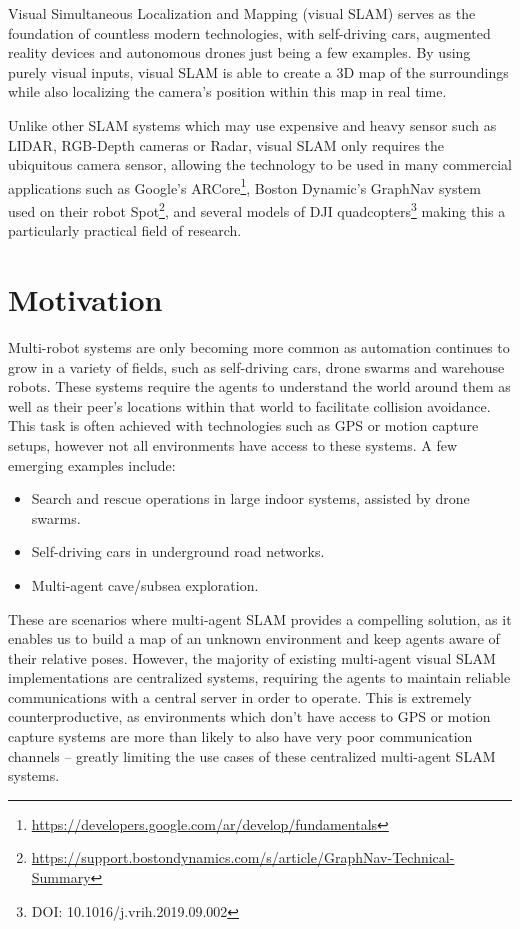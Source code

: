 
\label{sec:introduction}
Visual Simultaneous Localization and Mapping (visual SLAM) serves as the foundation of countless modern technologies, with self-driving cars, augmented reality devices and autonomous drones just being a few examples. By using purely visual inputs, visual SLAM is able to create a 3D map of the surroundings while also localizing the camera's position within this map in real time.

Unlike other SLAM systems which may use expensive and heavy sensor such as LIDAR, RGB-Depth cameras or Radar, visual SLAM only requires the ubiquitous camera sensor, allowing the technology to be used in many commercial applications such as Google's ARCore\footnote[1]{\url{https://developers.google.com/ar/develop/fundamentals}}, Boston Dynamic's GraphNav system used on their robot Spot\footnote[2]{\url{https://support.bostondynamics.com/s/article/GraphNav-Technical-Summary}}, and several models of DJI quadcopters\footnote[3]{DOI: 10.1016/j.vrih.2019.09.002} making this a particularly practical field of research.

\section{Motivation}
\label{sec:motivation}
Multi-robot systems are only becoming more common as automation continues to grow in a variety of fields, such as self-driving cars, drone swarms and warehouse robots. These systems require the agents to understand the world around them as well as their peer's locations within that world to facilitate collision avoidance. This task is often achieved with technologies such as GPS or motion capture setups, however not all environments have access to these systems. A few emerging examples include: \noparskip
\smallbreak

{
    \begin{itemize}[nosep]
        \item Search and rescue operations in large indoor systems, assisted by drone swarms.
        \item Self-driving cars in underground road networks.
        \item Multi-agent cave/subsea exploration.
    \end{itemize}
}

These are scenarios where multi-agent SLAM provides a compelling solution, as it enables us to build a map of an unknown environment and keep agents aware of their relative poses. However, the majority of existing multi-agent visual SLAM implementations are centralized systems, requiring the agents to maintain reliable communications with a central server in order to operate. This is extremely counterproductive, as environments which don't have access to GPS or motion capture systems are more than likely to also have very poor communication channels -- greatly limiting the use cases of these centralized multi-agent SLAM systems.

